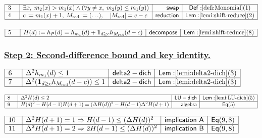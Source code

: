\documentclass[11pt,reqno]{amsart}
\begin{document}
\nointerlineskip\noindent$%
\begin{array}{|m{0.5cm}|l|r|c|}
\hline
3 & \exists x,\;m_{2}(x)>m_{1}(x)\wedge(\forall y\ne x,\;m_{2}(y)\le
m_{1}(y)) & \mathsf{swap} & \mathsf{Def:}\ref{defi:Monomial}(1) \\ \hline
4 & c:=m_{1}(x)+1,\;M_{\mathrm{red}}:=(\ldots),\quad|M_{\mathrm{red}}|=e-c & 
\mathsf{reduction} & \mathsf{Lem:}\ref{lemi:shift-reduce}(2) \\ \hline
\end{array}%
$

\nointerlineskip\noindent$%
\begin{array}{|m{0.5cm}|l|r|c|}
\hline
5 & H(d):=h_{P}(d)=h_{m_{1}}(d)+\mathbf{1}_{d\ge c}h_{M_{\mathrm{red}}}(d-c)
& \mathsf{decompose} & \mathsf{Lem:}\ref{lemi:shift-reduce}(8) \\ \hline
\end{array}%
$

\subsubsection*{\protect\underline{Step 2: Second-difference bound and key
identity.}}

\noindent$%
\begin{array}{|m{0.5cm}|l|r|c|}
\hline
6 & \Delta^{2}h_{m_{1}}(d)\le1 & \mathsf{delta2-dich} & \mathsf{Lem:}\ref%
{lemi:delta2-dich}(3) \\ \hline
7 & \Delta^{2}(\mathbf{1}_{d\ge c}h_{M_{\mathrm{red}}}(d-c))\le1 & \mathsf{%
delta2-dich} & \mathsf{Lem:}\ref{lemi:delta2-dich}(3) \\ \hline
\end{array}%
$

\nointerlineskip\noindent$%
\begin{array}{|m{0.5cm}|l|r|c|}
\hline
8 & \Delta^{2}H(d)\le2 & \mathsf{LU-dich} & \mathsf{Lem:}\ref{lemi:LU-dich}%
(5) \\ \hline
9 & H(d)^{2}-H(d-1)H(d+1)=(\Delta H(d))^{2}-H(d-1)\Delta^{2}H(d+1) & \mathsf{%
algebra} & \mathsf{Eq}(5) \\ \hline
\end{array}%
$

\nointerlineskip\noindent$%
\begin{array}{|m{0.5cm}|l|r|c|}
\hline
10 & \Delta^{2}H(d+1)=1\Rightarrow H(d-1)\le(\Delta H(d))^{2} & \mathsf{%
implication\ A} & \mathsf{Eq}(9,8) \\ \hline
11 & \Delta^{2}H(d+1)=2\Rightarrow2H(d-1)\le(\Delta H(d))^{2} & \mathsf{%
implication\ B} & \mathsf{Eq}(9,8) \\ \hline
\end{array}%
$
\end{document}

